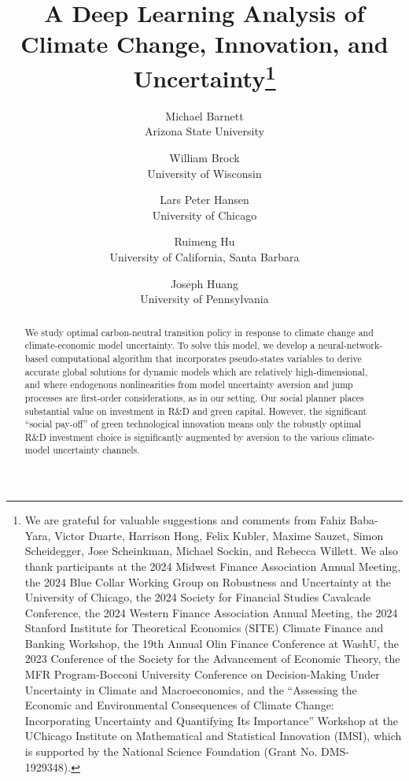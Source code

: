 \documentclass[12pt]{article}
\title{A Deep Learning Analysis of \\ Climate Change, Innovation, and Uncertainty\footnote{We are grateful for valuable suggestions and comments from Fahiz Baba-Yara, Victor Duarte, Harrison Hong, Felix Kubler, Maxime Sauzet, Simon Scheidegger, Jose Scheinkman, Michael Sockin, and Rebecca Willett. We also thank participants at the 2024 Midwest Finance Association Annual Meeting, the 2024 Blue Collar Working Group on Robustness and Uncertainty at the University of Chicago, the 2024 Society for Financial Studies Cavalcade Conference, the 2024 Western Finance Association Annual Meeting, the 2024 Stanford Institute for Theoretical Economics (SITE) Climate Finance and Banking Workshop, the 19th Annual Olin Finance Conference at WashU, the 2023 Conference of the Society for the Advancement of Economic Theory, the MFR Program-Bocconi University Conference on Decision-Making Under Uncertainty in Climate and Macroeconomics, and the ``Assessing the Economic and Environmental Consequences of Climate Change: Incorporating Uncertainty and Quantifying Its Importance'' Workshop at the UChicago Institute on Mathematical and Statistical Innovation (IMSI), which is supported by the National Science Foundation (Grant No. DMS-1929348).
}
}
\author{Michael Barnett \\ \small{Arizona State University } \and William Brock \\ \small{University of Wisconsin} \and Lars Peter Hansen \\ \small{University of Chicago} \and Ruimeng Hu \\ \small{University of California, Santa Barbara} \and Joseph Huang \\ \small{University of Pennsylvania}  
}
\date{}
\renewcommand{\thefootnote}{\fnsymbol{footnote}}
\begin{document}
\maketitle

\thispagestyle{empty}

\renewcommand{\thefootnote}{\arabic{footnote}}


\begin{abstract}

We study optimal carbon-neutral transition policy in response to climate change and climate-economic model uncertainty. To solve this model, we develop a neural-network-based computational algorithm that incorporates pseudo-states variables to derive accurate global solutions for dynamic models which are relatively high-dimensional, and where endogenous nonlinearities from model uncertainty aversion and jump processes are first-order considerations, as in our setting. Our social planner places substantial value on investment in R\&D and green capital. However, the significant ``social pay-off'' of green technological innovation means only the robustly optimal R\&D investment choice is significantly augmented by aversion to the various climate-model uncertainty channels. 

\end{abstract}



\thispagestyle{empty}

\newpage
{}
\renewcommand{\thepage} {\arabic{page}}











\end{document}
